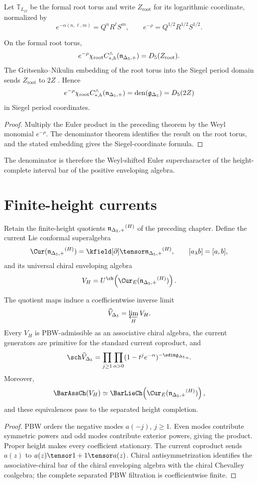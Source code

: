 Let $\mathbb T_{L_{II}}$ be the formal root torus and write $Z_{\mathrm{root}}$ for its logarithmic coordinate, normalized by
\[
 e^{-\alpha(n,\ell,m)}=Q^nR^\ell S^m,
 \qquad
 e^{-\rho}=Q^{1/2}R^{1/2}S^{1/2}.
\]

\begin{corollary}
On the formal root torus,
\[
 e^{-\rho}\chi_{\mathrm{root}}
 C_{*,h}^\wedge({\mathfrak n_{\Delta_5,+}})
 ={D_5}(Z_{\mathrm{root}}).
\]
The Gritsenko--Nikulin embedding of the root torus into the Siegel period domain sends $Z_{\mathrm{root}}$ to $2Z$ \cite{GN97,GN98b}. Hence
\[
 e^{-\rho}\chi_{\mathrm{root}}
 C_{*,h}^\wedge({\mathfrak n_{\Delta_5,+}})
 =\operatorname{den}({\mathfrak g_{\Delta_5}})={D_5}(2Z)
\]
in Siegel period coordinates.
\end{corollary}
\begin{proof}
Multiply the Euler product in the preceding theorem by the Weyl monomial $e^{-\rho}$.  The denominator theorem identifies the result on the root torus, and the stated embedding gives the Siegel-coordinate formula.
\end{proof}

The denominator is therefore the Weyl-shifted Euler supercharacter of the height-complete interval bar of the positive enveloping algebra.

\chapter{Finite-height currents}
Retain the finite-height quotients ${\mathfrak n_{\Delta_5,+}}^{(H)}$ of the preceding chapter.  Define the current Lie conformal superalgebra
\[
 \Cur(\nIg^{(H)})=\kfield[\partial]\tensor\nIg^{(H)},
 \qquad [a_\lambda b]=[a,b],
\]
and its universal chiral enveloping algebra
\[
 V_H=U^{\ch}\!\left(\Cur_E(\nIg^{(H)})\right).
\]

\begin{theorem}
The quotient maps induce a coefficientwise inverse limit
\[
 \widehat V_{\Delta_5}=\varprojlim_HV_H.
\]
Every $V_H$ is PBW-admissible as an associative chiral algebra, the current generators are primitive for the standard current coproduct, and
\[
 \sch\widehat V_{\Delta_5}
 =\prod_{j\ge1}\prod_{\alpha>0}
 (1-t^je^{-\alpha})^{-\sdim\gIg_\alpha}.
\]
Moreover,
\[
 \BarAssCh(V_H)
 \simeq
 \BarLieCh\!\left(\Cur_E(\nIg^{(H)})\right),
\]
and these equivalences pass to the separated height completion.
\end{theorem}
\begin{proof}
PBW orders the negative modes $a(-j)$, $j\ge1$.  Even modes contribute symmetric powers and odd modes contribute exterior powers, giving the product.  Proper height makes every coefficient stationary.  The current coproduct sends $a(z)$ to $a(z)\tensor1+1\tensor a(z)$.  Chiral antisymmetrization identifies the associative-chiral bar of the chiral enveloping algebra with the chiral Chevalley coalgebra; the complete separated PBW filtration is coefficientwise finite.
\end{proof}

